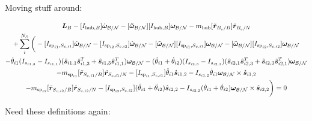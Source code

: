 \documentclass[paper]{aiaaNew}
\begin{document}
Moving stuff around:

\begin{multline}
\bm L_B -[I_{\text{hub},B}] \dot{\bm\omega}_{\cal B/N}  -[\bm{\tilde{\omega}}_{\cal B/N}] [I_{\text{hub},B}] \bm\omega_{\cal B/N} - m_{\text{hub}} [\tilde{{\bm r}}_{B_c/B}] \ddot{\bm r}_{B_c/N} \\
+ \sum\limits_{i}^{N_S}\bigg(-[I_{\text{sp}_{i1},S_{c,i1}}] \dot{\bm \omega}_{\cal{B/N}} -[I_{\text{sp}_{i2},S_{c,i2}}] \dot{\bm \omega}_{\cal{B/N}} -[\tilde{\bm \omega}_{\cal{B/N}}] [I_{\text{sp}_{i1},S_{c,i1}}] \bm \omega_{\cal{B/N}}-[\tilde{\bm \omega}_{\cal{B/N}}] [I_{\text{sp}_{i2},S_{c,i2}}] \bm \omega_{\cal{B/N}}\\
-\dot{\theta}_{i1} (I_{s_{i1,3}} - I_{s_{i1,1}})( \hat{\bm s}_{i1,1} \hat{\bm s}_{i1,3}^T + \hat{\bm s}_{i1,3} \hat{\bm s}_{i1,1}^T) \bm \omega_{\cal{B/N}} -(\dot{\theta}_{i1}  + \dot{\theta}_{i2})(I_{s_{i2,3}} - I_{s_{i2,1}}) (\hat{\bm s}_{i2,1} \hat{\bm s}_{i2,3}^T + \hat{\bm s}_{i2,3} \hat{\bm s}_{i2,1}^T) \bm \omega_{\cal{B/N}} \\
- m_{\text{sp}_{i1}} [\tilde{{\bm r}}_{S_{c,i1}/B}] \ddot{\bm r}_{S_{c,i1}/N} -[I_{\text{sp}_{i1},S_{c,i1}}] \ddot{\theta}_{i1} \hat{\bm s}_{i1,2} 
-I_{s_{i1,2}} \dot{\theta}_{i1} \bm \omega_{\cal{B/N}} \times \hat{\bm s}_{i1,2}\\
- m_{\text{sp}_{i2}} [\tilde{{\bm r}}_{S_{c,i2}/B}] \ddot{\bm r}_{S_{c,i2}/N} -[I_{\text{sp}_{i2},S_{c,i2}}] (\ddot{\theta}_{i1}  + \ddot{\theta}_{i2})\hat{\bm s}_{i2,2} 
-I_{s_{i2,2}}  (\dot{\theta}_{i1}  + \dot{\theta}_{i2}) \bm \omega_{\cal{B/N}} \times \hat{\bm s}_{i2,2} \bigg) = 0
\end{multline}

Need these definitions again:
\end{document}
